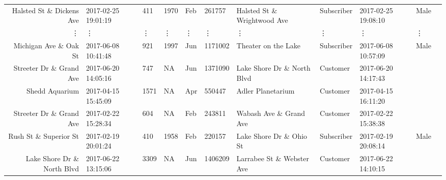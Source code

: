 \documentclass[11pt]{article}
\begin{document}
\begin{tabular}{r|llllllllll}
	 Halsted St \& Dickens Ave             & 2017-02-25 19:01:19                    &  411                                   & 1970                                   & Feb                                    &  261757                                & Halsted St \& Wrightwood Ave          & Subscriber                             & 2017-02-25 19:08:10                    & Male                                  \\
	 ⋮ & ⋮ & ⋮ & ⋮ & ⋮ & ⋮ & ⋮ & ⋮ & ⋮ & ⋮\\
	 Michigan Ave \& Oak St           & 2017-06-08 10:41:48               &  921                              & 1997                              & Jun                               & 1171002                           & Theater on the Lake               & Subscriber                        & 2017-06-08 10:57:09               & Male                             \\
	 Streeter Dr \& Grand Ave           & 2017-06-20 14:05:16                 &  747                                &   NA                                & Jun                                 & 1371090                             & Lake Shore Dr \& North Blvd        & Customer                            & 2017-06-20 14:17:43                 &                                    \\
	 Shedd Aquarium                    & 2017-04-15 15:45:09               & 1571                              &   NA                              & Apr                               &  550447                           & Adler Planetarium                 & Customer                          & 2017-04-15 16:11:20               &                                  \\
	 Streeter Dr \& Grand Ave           & 2017-02-22 15:28:34                 &  604                                &   NA                                & Feb                                 &  243811                             & Wabash Ave \& Grand Ave            & Customer                            & 2017-02-22 15:38:38                 &                                    \\
	 Rush St \& Superior St             & 2017-02-19 20:01:24                 &  410                                & 1958                                & Feb                                 &  220157                             & Lake Shore Dr \& Ohio St           & Subscriber                          & 2017-02-19 20:08:14                 & Male                               \\
	 Lake Shore Dr \& North Blvd        & 2017-06-22 13:15:06                 & 3309                                &   NA                                & Jun                                 & 1406209                             & Larrabee St \& Webster Ave         & Customer                            & 2017-06-22 14:10:15                 &                                    \\

\end{tabular}
\end{document}
